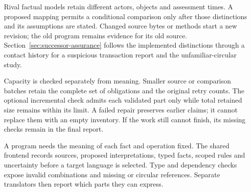 \begin{MapDiagram}
\end{MapDiagram}

Rival factual models retain different actors, objects and assessment times.
A proposed mapping permits a conditional comparison only after those
distinctions and its assumptions are stated. Changed source bytes or methods
start a new revision; the old program remains evidence for its old source.
Section~\ref{sec:successor-assurance} follows the implemented distinctions
through a contact history for a suspicious transaction report and the
unfamiliar-circular study.

Capacity is checked separately from meaning. Smaller source or comparison
batches retain the complete set of obligations and the original retry counts.
The optional incremental check admits each validated part only while total
retained size remains within its limit. A failed repair preserves earlier
claims; it cannot replace them with an empty inventory. If the work still
cannot finish, its missing checks remain in the final report.

\clearpage
{}
A program needs the meaning of each fact and operation fixed. The shared
frontend records sources, proposed interpretations, typed facts, scoped rules
and uncertainty before a target language is selected. Type and dependency
checks expose invalid combinations and missing or circular references.
Separate translators then report which parts they can express.

